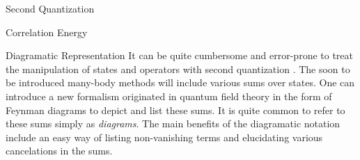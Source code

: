 \documentclass[twoside,english]{uiofysmaster}
\begin{document}
\begin{chapter}{Second Quantization}
\begin{section}{Correlation Energy}
	\end{section}
 
\end{chapter}



\begin{chapter}{Diagramatic Representation}
	It can be quite cumbersome and error-prone to treat the manipulation of states and operators with second quantization \cite{ShavittAndBartlett}. The soon to be introduced many-body methods will include various sums over states. One can introduce a new formalism originated in quantum field theory in the form of Feynman diagrams to depict and list these sums. It is quite common to refer to these sums simply as \textit{diagrams}. The main benefits of the diagramatic notation include an easy way of listing non-vanishing terms and elucidating various cancelations in the sums. 


\end{chapter}
\end{document}
